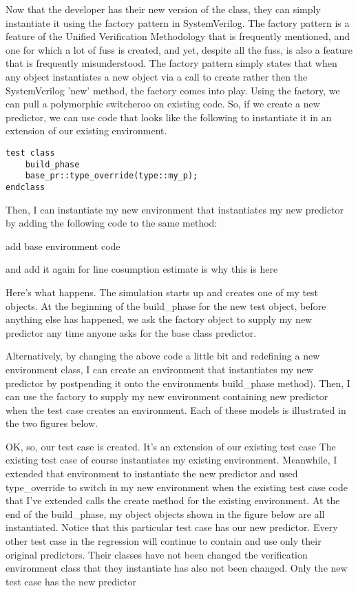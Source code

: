 \documentclass[twocolumn,letterpaper]{IEEEAerospaceCLS}  %
\begin{document}
Now that the developer has their new version of the class, they can simply instantiate it using the factory pattern in SystemVerilog. The factory pattern is a feature of the Unified Verification Methodology that is frequently mentioned, and one for which a lot of fuss is created, and yet, despite all the fuss, is also a feature  that is frequently misunderstood. The factory pattern simply states that when any object instantiates a new object via a call to create  rather then the SystemVerilog 'new' method, the factory comes into play. Using the factory, we can pull a polymorphic switcheroo on existing code. So, if we create a new predictor, we can use code that looks like the following to instantiate it in an extension of our existing environment.

\verb|test class|
\\
\verb|    build_phase|
\\
\verb|    base_pr::type_override(type::my_p);|
\\
\verb|endclass|


Then, I can instantiate my new environment that instantiates my new predictor by adding the following code to the same method:

add base environment code

and add it again for line cosumption estimate is why this is here

Here's what happens. The simulation starts up and creates one of my test objects. At the beginning of the build\_phase for the new test object, before anything else has happened, we ask the factory object to supply my new predictor any time anyone asks for the base class predictor.

Alternatively, by changing the above code a little bit and redefining a new environment class, I can create an environment that instantiates my new predictor by postpending it onto the environments build\_phase method). Then, I can use the factory to supply my new environment containing new predictor when the test case creates an environment. Each of these models is illustrated in the two figures below.

OK, so, our test case is created. It's an extension of our existing test case The existing test case of course instantiates my existing environment. Meanwhile, I extended that environment to instantiate the new predictor and used type\_override to switch in my new environment when the existing test case code that I've extended calls the create method for the existing environment. At the end of the build\_phase, my object objects shown in the figure below are all instantiated. Notice that this particular test case has our new predictor. Every other test case in the regression will continue to contain and use only their original predictors. Their classes have not been changed the verification environment class that they instantiate has also not been changed. Only the new test case has the new predictor
\end{document}
